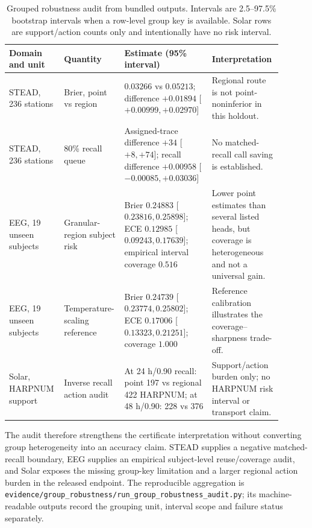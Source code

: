 \documentclass[11pt,a4paper]{article}
\numberwithin{equation}{section}
\theoremstyle{definition}\newtheorem{definition}[theorem]{Definition}
\theoremstyle{remark}\newtheorem{remark}[theorem]{Remark}
\begin{document}
\begin{table}[H]
\centering\small
\caption{Grouped robustness audit from bundled outputs. Intervals are 2.5--97.5\% bootstrap intervals when a row-level group key is available. Solar rows are support/action counts only and intentionally have no risk interval.}
\begin{tabular}{L{0.18\linewidth}L{0.19\linewidth}L{0.31\linewidth}L{0.22\linewidth}}
\toprule
Domain and unit & Quantity & Estimate (95\% interval) & Interpretation\\
\midrule
STEAD, 236 stations & Brier, point vs region & $0.03266$ vs $0.05213$; difference $+0.01894$ [$+0.00999,+0.02970$] & Regional route is not point-noninferior in this holdout.\\
STEAD, 236 stations & 80\% recall queue & Assigned-trace difference $+34$ [$+8,+74$]; recall difference $+0.00958$ [$-0.00085,+0.03036$] & No matched-recall call saving is established.\\
EEG, 19 unseen subjects & Granular-region subject risk & Brier $0.24883$ [$0.23816,0.25898$]; ECE $0.12985$ [$0.09243,0.17639$]; empirical interval coverage $0.516$ & Lower point estimates than several listed heads, but coverage is heterogeneous and not a universal gain.\\
EEG, 19 unseen subjects & Temperature-scaling reference & Brier $0.24739$ [$0.23774,0.25802$]; ECE $0.17006$ [$0.13323,0.21251$]; coverage $1.000$ & Reference calibration illustrates the coverage--sharpness trade-off.\\
Solar, HARPNUM support & Inverse recall action audit & At 24 h/0.90 recall: point 197 vs regional 422 HARPNUM; at 48 h/0.90: 228 vs 376 & Support/action burden only; no HARPNUM risk interval or transport claim.\\
\bottomrule
\end{tabular}
\end{table}

The audit therefore strengthens the certificate interpretation without converting
group heterogeneity into an accuracy claim. STEAD supplies a negative matched-
recall boundary, EEG supplies an empirical subject-level reuse/coverage audit,
and Solar exposes the missing group-key limitation and a larger regional action
burden in the released endpoint. The reproducible aggregation is
\texttt{evidence/group\_robustness/run\_group\_robustness\_audit.py}; its
machine-readable outputs record the grouping unit, interval scope and failure
status separately.
\end{document}
